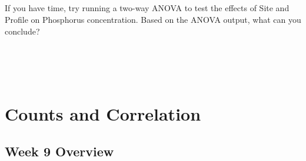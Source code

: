 \documentclass[
]{scrbook}
\begin{document}
\begin{verbatim}





\end{verbatim}

If you have time, try running a two-way ANOVA to test the effects of Site and Profile on Phosphorus concentration.
Based on the ANOVA output, what can you conclude?

\begin{verbatim}




\end{verbatim}

\hypertarget{part-counts-and-correlation}{%
\part{Counts and Correlation}\label{part-counts-and-correlation}}

\hypertarget{Week9}{%
\chapter*{Week 9 Overview}\label{Week9}}
\end{document}
